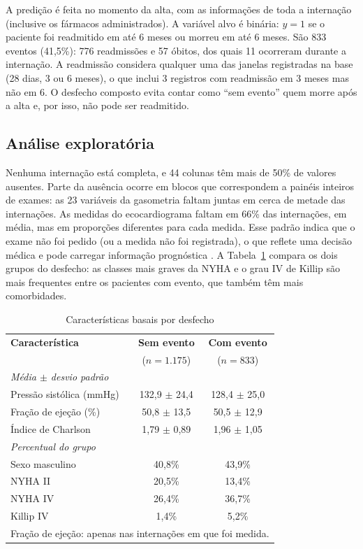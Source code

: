 \documentclass[conference]{IEEEtran}
\begin{document}
A predição é feita no momento da alta, com as informações de toda a internação (inclusive os fármacos administrados). A variável alvo é binária: $y = 1$ se o paciente foi readmitido em até 6 meses ou morreu em até 6 meses. São 833 eventos (41,5\%): 776 readmissões e 57 óbitos, dos quais 11 ocorreram durante a internação. A readmissão considera qualquer uma das janelas registradas na base (28 dias, 3 ou 6 meses), o que inclui 3 registros com readmissão em 3 meses mas não em 6. O desfecho composto evita contar como ``sem evento'' quem morre após a alta e, por isso, não pode ser readmitido.

\subsection{Análise exploratória}

Nenhuma internação está completa, e 44 colunas têm mais de 50\% de valores ausentes. Parte da ausência ocorre em blocos que correspondem a painéis inteiros de exames: as 23 variáveis da gasometria faltam juntas em cerca de metade das internações. As medidas do ecocardiograma faltam em 66\% das internações, em média, mas em proporções diferentes para cada medida. Esse padrão indica que o exame não foi pedido (ou a medida não foi registrada), o que reflete uma decisão médica e pode carregar informação prognóstica \cite{b9}. A Tabela~\ref{tab:basais} compara os dois grupos do desfecho: as classes mais graves da NYHA e o grau IV de Killip são mais frequentes entre os pacientes com evento, que também têm mais comorbidades.

\begin{table}[htbp]
\caption{Características basais por desfecho}
\label{tab:basais}
\centering
\small
\begin{tabular}{lcc}
\toprule
\textbf{Característica} & \textbf{Sem evento} & \textbf{Com evento} \\
 & ($n = 1.175$) & ($n = 833$) \\
\midrule
\multicolumn{3}{l}{\textit{Média $\pm$ desvio padrão}} \\
Pressão sistólica (mmHg) & 132,9 $\pm$ 24,4 & 128,4 $\pm$ 25,0 \\
Fração de ejeção (\%) & 50,8 $\pm$ 13,5 & 50,5 $\pm$ 12,9 \\
Índice de Charlson & 1,79 $\pm$ 0,89 & 1,96 $\pm$ 1,05 \\
\midrule
\multicolumn{3}{l}{\textit{Percentual do grupo}} \\
Sexo masculino & 40,8\% & 43,9\% \\
NYHA II & 20,5\% & 13,4\% \\
NYHA IV & 26,4\% & 36,7\% \\
Killip IV & 1,4\% & 5,2\% \\
\bottomrule
\multicolumn{3}{l}{\scriptsize Fração de ejeção: apenas nas internações em que foi medida.}
\end{tabular}
\end{table}
\end{document}
